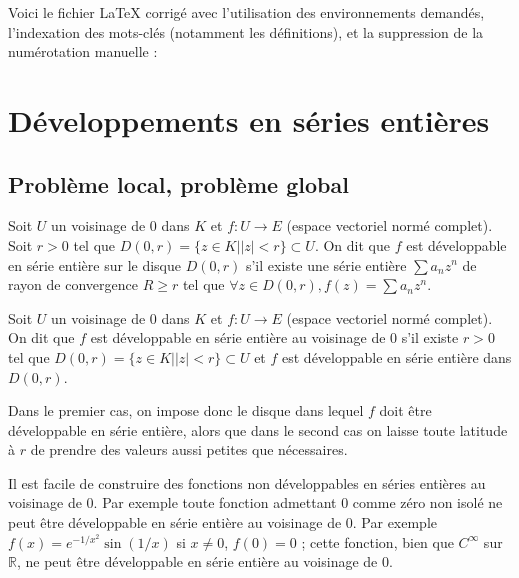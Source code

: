 Voici le fichier LaTeX corrigé avec l'utilisation des environnements demandés, l'indexation des mots-clés (notamment les définitions), et la suppression de la numérotation manuelle :

\section{Développements en séries entières}

\subsection{Problème local, problème global}

\begin{de}
Soit $U$ un voisinage de 0 dans $K$ et $f : U \rightarrow E$ (espace vectoriel normé complet). Soit $r > 0$ tel que $D(0,r) = \{z \in K | |z| < r\} \subset U$. On dit que $f$ est développable en série entière sur le disque $D(0,r)$ s'il existe une série entière $\sum a_n z^n$ de rayon de convergence $R \geq r$ tel que $\forall z \in D(0,r), f(z) = \sum a_n z^n$.
\end{de}

\begin{de}
Soit $U$ un voisinage de 0 dans $K$ et $f : U \rightarrow E$ (espace vectoriel normé complet). On dit que $f$ est développable en série entière au voisinage de 0 s'il existe $r > 0$ tel que $D(0,r) = \{z \in K | |z| < r\} \subset U$ et $f$ est développable en série entière dans $D(0,r)$.
\end{de}

\begin{rem}
Dans le premier cas, on impose donc le disque dans lequel $f$ doit être développable en série entière, alors que dans le second cas on laisse toute latitude à $r$ de prendre des valeurs aussi petites que nécessaires.
\end{rem}

\begin{rem}
Il est facile de construire des fonctions non développables en séries entières au voisinage de 0. Par exemple toute fonction admettant 0 comme zéro non isolé ne peut être développable en série entière au voisinage de 0. Par exemple $f(x) = e^{-1/x^2} \sin(1/x)$ si $x \neq 0$, $f(0) = 0$ ; cette fonction, bien que $C^\infty$ sur $\mathbb{R}$, ne peut être développable en série entière au voisinage de 0.
\end{rem}

